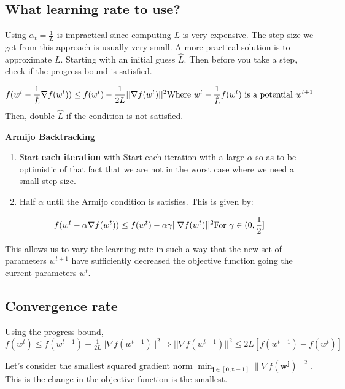 \documentclass[
]{article}
\begin{document}
\subsection{What learning rate to use?}\label{what-learning-rate-to-use}

Using \(\alpha_t = \frac{1}{L}\) is impractical since computing \(L\) is very expensive. The step size we get from this approach is usually very small. A more practical solution is to approximate \(L\). Starting with an initial guess \(\hat{L}\). Then before you take a step, check if the progress bound is satisfied.

\[
f(w^t -\frac{1}{\hat{L}} \nabla f(w^{t})) \le f(w^{t}) - \frac{1}{2L} ||\nabla f(w^{t})||^2\\
\text{Where } w^t -\frac{1}{\hat{L}} f(w^{t}) \text{ is a potential } w^{t+1}
\]
Then, double \(\hat{L}\) if the condition is not satisfied.

\textbf{Armijo Backtracking}

\begin{enumerate}
\def\labelenumi{\arabic{enumi}.}
\item
  Start \textbf{each iteration} with Start each iteration with a large \(\alpha\) so as to be optimistic of that fact that we are not in the worst case where we need a small step size.
\item
  Half \(\alpha\) until the Armijo condition is satisfies. This is given by:
\end{enumerate}

\[
f(w^t - \alpha \nabla f(w^{t})) \le f(w^t) - \alpha \gamma ||\nabla f(w^t)||^2 \\
\text{For } \gamma \in (0, \frac{1}{2}]
\]

This allows us to vary the learning rate in such a way that the new set of parameters \(w^{t+1}\) have sufficiently decreased the objective function going the current parameters \(w^t\).

\subsection{Convergence rate}\label{convergence-rate}

Using the progress bound, \(f(w^t) \le f(w^{t-1}) - \frac{1}{2L} ||\nabla f(w^{t-1})||^2 \Longrightarrow ||\nabla f(w^{t-1})||^2 \le 2L[f(w^{t-1}) - f(w^t)]\)

Let's consider the smallest squared gradient norm \(\min_{\mathbf{j \in {[0, t-1]}}} \|\nabla f(\mathbf{w^j})\|^2\). This is the change in the objective function is the smallest.
\end{document}
